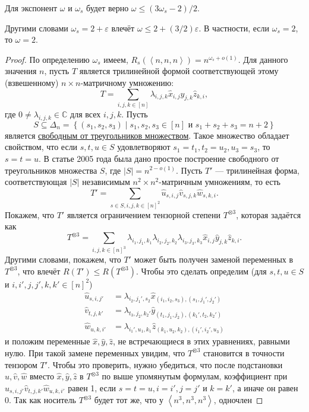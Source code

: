 \begin{theorem}
  \label{th:12:3.6} Для экспонент $\omega$ и $\omega_s$ будет верно $\omega \leq (3 \omega_s - 2)/2$.
\end{theorem}
Другими словами $\omega_s = 2 + \varepsilon$ влечёт $\omega \leq 2 + (3/2) \varepsilon$. В частности, если $\omega_s=2$, то $\omega=2$.
\begin{proof}
  По определению $\omega_s$ имеем, $R_s(\left\langle n,n,n \right\rangle)=n^{\omega_s + o(1)}$. Для данного значения $n$, пусть $T$ является трилинейной формой соответствующей этому (взвешенному) $n \times n$-матричному умножению:
  \[
  	T = \sum_{i,j,k \in [n]} \lambda_{i,j,k} \widehat{x}_{i,j} \widehat{y}_{j,k} \widehat{z}_{k,i},
  \]
  где $0 \neq \lambda_{i,j,k} \in \mathbb{C}$ для всех $i,j,k$. Пусть
  \[
  	S \subseteq \Delta_n = \left\{ (s_1, s_2, s_3) \mid s_1,s_2,s_3 \in [n] \text{ и } s_1+s_2+s_3=n+2 \right\}
  \]
  является \hyperref[def:triangle-free]{свободным от треугольников множеством}. Такое множество обладает свойством, что если $s,t,u \in S$ удовлетворяют $s_1=t_1, t_2=u_2, u_3=s_3$, то $s=t=u$. В статье 2005 года была дано простое построение свободного от треугольников множества $S$, где $|S|=n^{2-o(1)}$. Пусть $T'$ --- трилинейная форма, соответствующая $|S|$ независимым $n^2 \times n^2$-матричным умножениям, то есть
  \[
  	T'=\sum_{s \in S, i,j,k \in [n]^2} \widehat{u}_{s,i,j} \widehat{v}_{s,j,k} \widehat{w}_{s,k,i}.
  \]
  Покажем, что $T'$ является ограничением тензорной степени $T^{\otimes 3}$, которая задаётся как
  \[
  	T^{\otimes 3}=\sum_{i,j,k \in [n]^3} \lambda_{i_1,j_1,k_1} \lambda_{i_2,j_2,k_2} \lambda_{i_3,j_3,k_3} \widehat{x}_{i,j} \widehat{y}_{j,k} \widehat{z}_{k,i}.
  \]
  Другими словами, покажем, что $T'$ может быть получен заменой переменных в $T^{\otimes 3}$, что влечёт $R(T') \leq R(T^{\otimes 3})$. Чтобы это сделать определим (для $s,t,u \in S$ и $i,i',j,j',k,k' \in [n]^2$)
  \begin{align*}
    \widehat{u}_{s,i,j'} & =\lambda_{i_2,j_1',s_2} \widehat{x}_{(i_1,i_2,s_3),(s_1, j_1', j_2')}  \\
    \widehat{v}_{t,j,k'} & =\lambda_{t_3,j_2,k_2'} \widehat{y}_{(t_1,j_1,j_2),(k_1',t_2,k_2')} \\
    \widehat{w}_{u,k,i'} & =\lambda_{i_1',u_1,k_1} \widehat{z}_{(k_1,u_2,k_2),(i_1',i_2',u_3)}
  \end{align*}
  и положим переменные $\widehat{x}, \widehat{y}, \widehat{z}$, не встречающиеся в этих уравнениях, равными нулю. При такой замене переменных увидим, что $T^{\otimes 3}$ становится в точности тензором $T'$. Чтобы это проверить, нужно убедиться, что после подстановки $\widehat{u}, \widehat{v}, \widehat{w}$ вместо $\widehat{x}, \widehat{y}, \widehat{z}$ в $T^{\otimes 3}$ по выше упомянутым формулам, коэффициент при $\widehat{u}_{s,i,j'} \widehat{v}_{t,j,k'} \widehat{w}_{u,k,i'}$ равен 1, если $s=t=u, i=i', j=j'$ и $k=k'$, а иначе он равен 0. Так как носитель $T^{\otimes 3}$ будет тот же, что у $\left\langle n^3,n^3,n^3 \right\rangle$, одночлен 

\end{proof}
